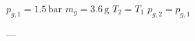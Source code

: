 \( p_{g,1} = 1.5 \, \text{bar} \)  
\( m_g = 3.6 \, \text{g} \)  
\( T_2 = T_1 \)  
\( p_{g,2} = p_{g,1} \)  

---